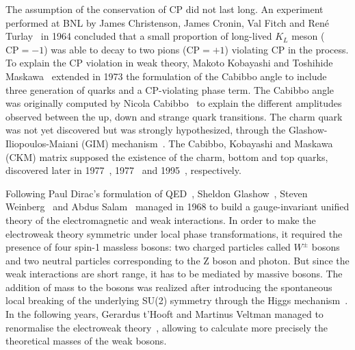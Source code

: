 The assumption of the conservation of CP did not last long. An experiment performed at BNL by James Christenson, James Cronin, Val Fitch and Ren{\'e} Turlay~\cite{KMeson} in 1964 concluded that a small proportion of long-lived $K_{L}$ meson ($\text{CP}=-1$) was able to decay to two pions ($\text{CP}=+1$) violating CP in the process. To explain the CP violation in weak theory, Makoto Kobayashi and Toshihide Maskawa~\cite{CKMMatrix} extended in 1973 the formulation of the Cabibbo angle to include three generation of quarks and a CP-violating phase term. The Cabibbo angle was originally computed by Nicola Cabibbo~\cite{CabibboMatrix} to explain the different amplitudes observed between the up, down and strange quark transitions. The charm quark was not yet discovered but was strongly hypothesized, through the Glashow-Iliopoulos-Maiani (GIM) mechanism~\cite{GIM}. The Cabibbo, Kobayashi and Maskawa (CKM) matrix supposed the existence of the charm, bottom and top quarks, discovered later in 1977~\cite{JPsiDiscovery,JPsiDiscovery_2}, 1977~\cite{BottomQuarkDiscovery} and 1995~\cite{TopQuarkDiscovery}, respectively.

Following Paul Dirac's formulation of QED~\cite{DiracQED}, Sheldon Glashow~\cite{Glashow:1959wxa}, Steven Weinberg~\cite{Weinberg:1967tq} and Abdus Salam~\cite{Salam:1968rm} managed in 1968 to build a gauge-invariant unified theory of the electromagnetic and weak interactions. In order to make the electroweak theory symmetric under local phase transformations, it required the presence of four spin-1 massless bosons: two charged particles called $W^{\pm}$ bosons and two neutral particles corresponding to the Z boson and photon. But since the weak interactions are short range, it has to be mediated by massive bosons. The addition of mass to the bosons was realized after introducing the spontaneous local breaking of the underlying SU(2) symmetry through the Higgs mechanism~\cite{HiggsMechanism_1,HiggsMechanism_2}. In the following years, Gerardus t'Hooft and Martinus Veltman managed to renormalise the electroweak theory~\cite{Renormalization_1,Renormalization_2}, allowing to calculate more precisely the theoretical masses of the weak bosons.

